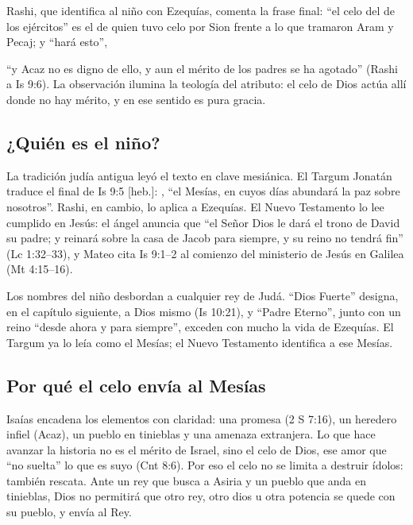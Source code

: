 Rashi, que identifica al niño con Ezequías, comenta la frase final: ``el celo del \SENOR{} de los ejércitos'' es el de quien tuvo celo por Sion frente a lo que tramaron Aram y Pecaj; y ``hará esto'',


``y Acaz no es digno de ello, y aun el mérito de los padres se ha agotado'' (Rashi a Is 9:6). La observación ilumina la teología del atributo: el celo de Dios actúa allí donde no hay mérito, y en ese sentido es pura gracia.


\subsection{¿Quién es el niño?}
La tradición judía antigua leyó el texto en clave mesiánica. El Targum Jonatán traduce el final de Is 9:5 [heb.]: , ``el Mesías, en cuyos días abundará la paz sobre nosotros''. Rashi, en cambio, lo aplica a Ezequías. El Nuevo Testamento lo lee cumplido en Jesús: el ángel anuncia que ``el Señor Dios le dará el trono de David su padre; y reinará sobre la casa de Jacob para siempre, y su reino no tendrá fin'' (Lc 1:32--33), y Mateo cita Is 9:1--2 al comienzo del ministerio de Jesús en Galilea (Mt 4:15--16).

Los nombres del niño desbordan a cualquier rey de Judá. ``Dios Fuerte'' designa, en el capítulo siguiente, a Dios mismo (Is 10:21), y ``Padre Eterno'', junto con un reino ``desde ahora y para siempre'', exceden con mucho la vida de Ezequías. El Targum ya lo leía como el Mesías; el Nuevo Testamento identifica a ese Mesías.

\subsection{Por qué el celo envía al Mesías}
Isaías encadena los elementos con claridad: una promesa (2 S 7:16), un heredero infiel (Acaz), un pueblo en tinieblas y una amenaza extranjera. Lo que hace avanzar la historia no es el mérito de Israel, sino el celo de Dios, ese amor que ``no suelta'' lo que es suyo (Cnt 8:6). Por eso el celo no se limita a destruir ídolos: también rescata. Ante un rey que busca a Asiria y un pueblo que anda en tinieblas, Dios no permitirá que otro rey, otro dios u otra potencia se quede con su pueblo, y envía al Rey.

